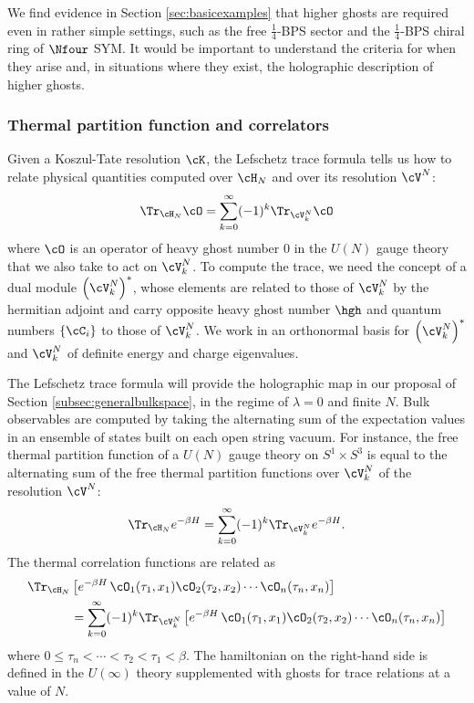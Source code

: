 \documentclass[a4paper,12pt]{article}
\begin{document}
We find evidence in Section \ref{sec:basicexamples} that higher ghosts are required even in rather simple settings, such as the free $\frac{1}{4}$-BPS sector and the $\frac{1}{4}$-BPS chiral ring of $\Nfour$ SYM. It would be important to understand the criteria for when they arise and, in situations where they exist, the holographic description of higher ghosts.



\subsubsection{Thermal partition function and correlators} \label{subsubsec:lefschetztrace}

Given a Koszul-Tate resolution $\cK$, the Lefschetz trace formula \cite{Henneaux:1992ig} tells us how to relate physical quantities computed over $\cH_N$ and over its resolution $\cV^N$:
\begin{equation} \label{eq:lefschetz}
\Tr_{\cH_N} \cO = \sum_{k=0}^\infty (-1)^k \Tr_{\cV_k^N} \cO
\end{equation}
where $\cO$ is an operator of heavy ghost number $0$ in the $U(N)$ gauge theory that we also take to act on $\cV_k^N$. To compute the trace, we need the concept of a dual module $\left(\cV_k^N\right)^*$, whose elements are related to those of $\cV_k^N$ by the hermitian adjoint and carry opposite heavy ghost number $\hgh$ and quantum numbers $\{ \cC_i \}$ to those of $\cV_k^N$. We work in an orthonormal basis for $\left(\cV_k^N\right)^*$ and $\cV_k^N$ of definite energy and charge eigenvalues.

The Lefschetz trace formula will provide the holographic map in our proposal of Section \ref{subsec:generalbulkspace}, in the regime of $\lambda = 0$ and finite $N$. Bulk observables are computed by taking the alternating sum of the expectation values in an ensemble of states built on each open string vacuum. For instance, the free thermal partition function of a $U(N)$ gauge theory on $S^1 \times S^3$ is equal to the alternating sum of the free thermal partition functions over $\cV_k^N$ of the resolution $\cV^N$:
\begin{equation} \label{eq:lefschetzthermalpartition}
\Tr_{\cH_N} e^{-\beta H} = \sum_{k=0}^\infty (-1)^k \Tr_{\cV_k^N} e^{-\beta H}.
\end{equation}
The thermal correlation functions are related as
\begin{align} \label{eq:lefschetzcorrelator}
    \Tr_{\cH_N} &\left[ e^{-\beta H} \, \cO_1 (\tau_1, x_1) \cO_2 (\tau_2, x_2) \cdots \cO_n(\tau_n,x_n) \right] \nonumber \\
    &= \sum_{k=0}^\infty (-1)^k \Tr_{\cV_k^N} \left[ e^{-\beta H} \, \cO_1 (\tau_1, x_1) \cO_2 (\tau_2, x_2) \cdots \cO_n(\tau_n,x_n) \right]
\end{align}
where $0 \leq \tau_n < \cdots < \tau_2 < \tau_1 < \beta$. The hamiltonian on the right-hand side is defined in the $U(\infty)$ theory supplemented with ghosts for trace relations at a value of $N$.
\end{document}
